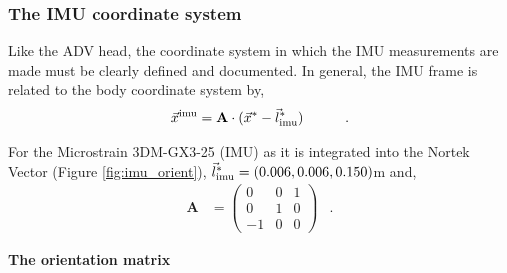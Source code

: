 \subsubsection{The IMU coordinate system}\label{apdx:coord-sys:imu}

Like the ADV head, the coordinate system in which the IMU measurements are made must be clearly defined and documented. In general, the IMU frame is related to the body coordinate system by,
\begin{align*}
  \vec{x}^\mathrm{imu} &= \mathbf{A}  \cdot (\vec{x}^* - \vec{l}^*_\mathrm{imu}) & \qquad .
\end{align*}

For the Microstrain 3DM-GX3-25 (IMU) as it is integrated into the Nortek Vector (Figure \ref{fig:imu_orient}), $\vec{l}^*_\mathrm{imu} = (0.006, 0.006, 0.150)$m and,
\begin{align*}
  \mathbf{A} &=
  \left (
    \begin{array}{ccc}
      0 & 0 & 1 \\
      0 & 1 & 0 \\
      -1 & 0 & 0
    \end{array}
  \right ) & .
\end{align*}


{\bf The orientation matrix}
\def\omatr{\ensuremath{\mathrm{\mathbf{R_\mathrm{imu}}}}}

